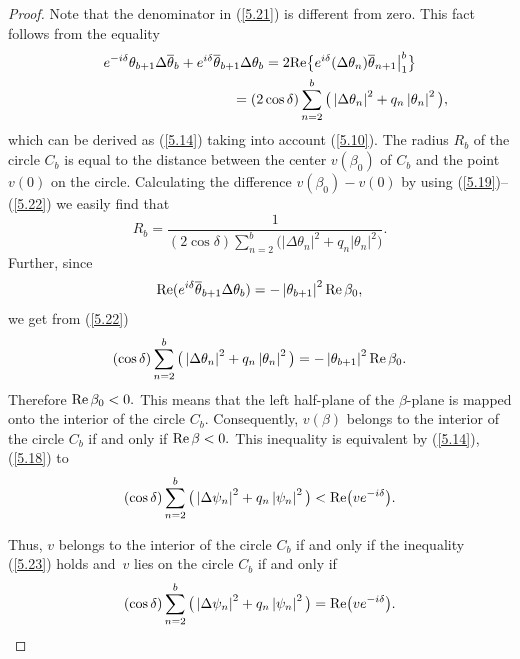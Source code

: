 \begin{proof}
Note that the denominator in (\ref{5.21}) is dif\/ferent from zero. This fact
follows from the equality%
\begin{gather}
e^{-i\delta }\theta _{b+1}\Delta \overline{\theta }_{b}+e^{i\delta }%
\overline{\theta }_{b+1}\Delta \theta _{b}=2{\rm Re}\big\{ e^{i\delta
}(\Delta \theta _{n})\overline{\theta }_{n+1}\big|_{1}^{b}\big\}\nonumber\\
\phantom{e^{-i\delta }\theta _{b+1}\Delta \overline{\theta }_{b}+e^{i\delta }%
\overline{\theta }_{b+1}\Delta \theta _{b}}{}
=(2\cos \delta )\sum_{n=2}^{b}\big( \left\vert \Delta \theta
_{n}\right\vert ^{2}+q_{n}\left\vert \theta _{n}\right\vert ^{2}\big),
\label{5.22}
\end{gather}%
which can be derived as (\ref{5.14}) taking into account (\ref{5.10}). The
radius $R_{b}$ of the circle $C_{b}$ is equal to the distance between the
center $v(\beta _{0})$ of $C_{b}$ and the point $v(0)$ on the circle.
Calculating the dif\/ference $v(\beta _{0})-v(0)$ by using (\ref{5.19})--(\ref{5.22}) we easily f\/ind that%
\[
R_{b}=\frac{1}{(2\cos \delta )\sum\limits_{n=2}^{b}\big( \left\vert \Delta \theta
_{n}\right\vert ^{2}+q_{n}\left\vert \theta _{n}\right\vert ^{2}\big) }.
\]%
Further, since%
\[
{\rm Re}(e^{i\delta }\overline{\theta }_{b+1}\Delta \theta
_{b})=-\left\vert \theta _{b+1}\right\vert ^{2}{\rm Re}\,\beta _{0},
\]%
we get from (\ref{5.22})%
\[
(\cos \delta )\sum_{n=2}^{b}\big( \left\vert \Delta \theta _{n}\right\vert
^{2}+q_{n}\left\vert \theta _{n}\right\vert ^{2}\big) =-\left\vert \theta
_{b+1}\right\vert ^{2}{\rm Re}\, \beta _{0}.
\]%
Therefore ${\rm Re}\,\beta _{0}<0.$ This means that the left half-plane of
the $\beta $-plane is mapped onto the interior of the circle $C_{b}.$
Consequently, $v(\beta )$ belongs to the interior of the circle $C_{b}$ if
and only if ${\rm Re}\,\beta <0.$ This inequality is equivalent by (\ref{5.14}), (\ref{5.18}) to%
\begin{equation}
(\cos \delta )\sum_{n=2}^{b}\big( \left\vert \Delta \psi _{n}\right\vert
^{2}+q_{n}\left\vert \psi _{n}\right\vert ^{2}\big) <{\rm Re}\big(ve^{-i\delta }\big).  \label{5.23}
\end{equation}

Thus, $v$ belongs to the interior of the circle $C_{b}$ if and only if the
inequality (\ref{5.23}) holds and~$v$ lies on the circle $C_{b}$ if and only
if%
\[
(\cos \delta )\sum_{n=2}^{b}\big( \left\vert \Delta \psi _{n}\right\vert
^{2}+q_{n}\left\vert \psi _{n}\right\vert ^{2}\big) ={\rm Re}
\big(ve^{-i\delta }\big).
\]


\end{proof}
